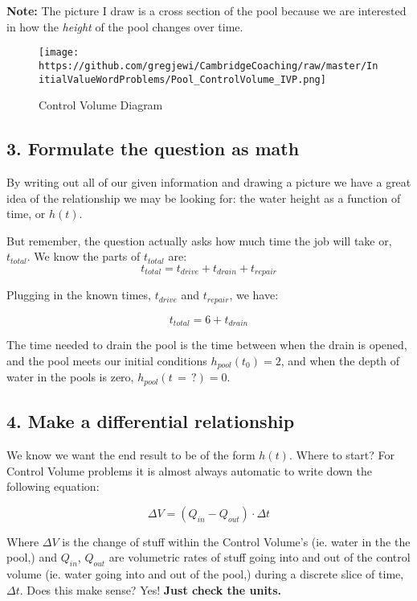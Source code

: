 \documentclass[11pt]{article}
\makeatletter
\def\maxwidth{\ifdim\Gin@nat@width>\linewidth\linewidth
    \else\Gin@nat@width\fi}
\let\Oldincludegraphics\includegraphics
\renewcommand{\includegraphics}[1]{\Oldincludegraphics[width=.8\maxwidth]{#1}}
\makeatother
\begin{document}
\textbf{Note:} The picture I draw is a cross section of the pool because
we are interested in how the \emph{height} of the pool changes over
time.

\begin{figure}
\centering
\texttt{[image: https://github.com/gregjewi/CambridgeCoaching/raw/master/InitialValueWordProblems/Pool\_ControlVolume\_IVP.png]}
\caption{Control Volume Diagram}
\end{figure}

    \hypertarget{formulate-the-question-as-math}{%
\subsection{3. Formulate the question as
math}\label{formulate-the-question-as-math}}

By writing out all of our given information and drawing a picture we
have a great idea of the relationship we may be looking for: the water
height as a function of time, or \(h(t)\).

But remember, the question actually asks how much time the job will take
or, \(t_{total}\). We know the parts of \(t_{total}\) are:
\[t_{total} = t_{drive} + t_{drain} + t_{repair}\]

Plugging in the known times, \(t_{drive}\) and \(t_{repair}\), we have:

\[t_{total} = 6 + t_{drain}\]

The time needed to drain the pool is the time between when the drain is
opened, and the pool meets our initial conditions \(h_{pool}(t_0) = 2\),
and when the depth of water in the pools is zero,
\(h_{pool}(t \,= \, ?) = 0\).

    \hypertarget{make-a-differential-relationship}{%
\subsection{4. Make a differential
relationship}\label{make-a-differential-relationship}}

We know we want the end result to be of the form \(h(t)\). Where to
start? For Control Volume problems it is almost always automatic to
write down the following equation:

\[\Delta V = \left(Q_{in} - Q_{out}\right) \cdot \Delta t\]

Where \(\Delta V\) is the change of stuff within the Control Volume's
(ie. water in the the pool,) and \(Q_{in}\), \(Q_{out}\) are volumetric
rates of stuff going into and out of the control volume (ie. water going
into and out of the pool,) during a discrete slice of time,
\(\Delta t\). Does this make sense? Yes! \textbf{Just check the units.}
\end{document}
